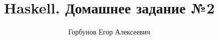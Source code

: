 

\title{Haskell. Домашнее задание №2}
\author{Горбунов Егор Алексеевич}


\maketitle


\task{}
\task{}
\task{}
\task{}

